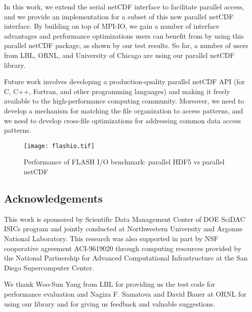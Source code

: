 \documentclass[10pt,twocolumn]{article}          %
\begin{document}
In this work, we extend the serial netCDF interface to facilitate parallel access, and we provide an
implementation for a subset of this new parallel netCDF interface. By building on top of MPI-IO, we
gain a number of interface advantages and performance optimizations users can benefit from
by using this parallel netCDF package, as shown by our test results. So far, 
a number of users from LBL, ORNL, and University of Chicago are using our parallel netCDF library.

Future work involves developing a production-quality parallel netCDF API (for C, C++, Fortran, and
other programming languages) and making it freely available to the high-performance computing community.
Moreover, we need to develop a mechanism for matching the file organization to access patterns, and
we need to develop cross-file optimizations for addressing common data access patterns.

\begin{figure}
\begin{center}
\texttt{[image: flashio.tif]}
\end{center}
\vskip -0.1in \caption{Performance of FLASH I/O benchmark:
parallel HDF5 vs parallel netCDF} \label{figure:flashio}
\end{figure}

\subsection*{Acknowledgements}


This work is sponsored by Scientific Data Management Center of DOE SciDAC ISICs program and jointly
conducted at Northwestern University and Argonne National Laboratory. This research was also
supported in part by NSF cooperative agreement ACI-9619020 through computing resources provided by
the National Partnership for Advanced Computational Infrastructure at the San Diego Supercomputer
Center.

We thank Woo-Sun Yang from LBL for providing us the test code for
performance evaluation  and Nagiza F. Samatova and David Bauer at
ORNL for using our library and for giving us feedback and
valuable suggestions.
\end{document}
